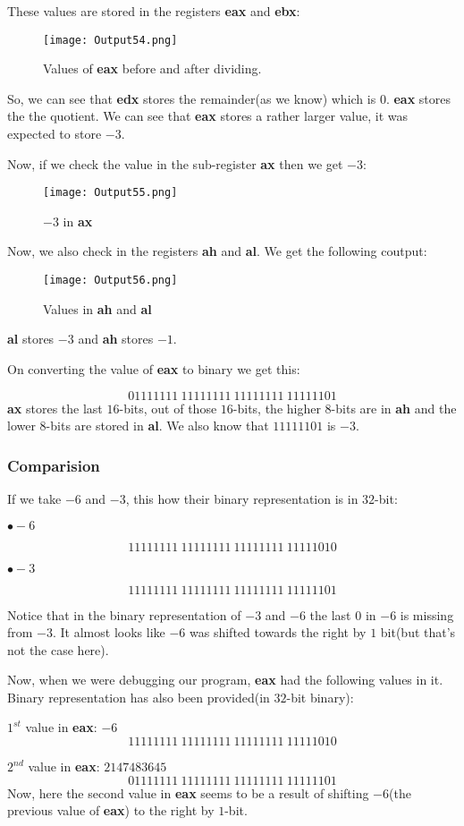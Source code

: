 \documentclass{article}
\makeatletter
\renewcommand\paragraph{\@startsection{paragraph}{4}{\z@}{-3.25ex \@plus -1ex \@minus -.2ex}{1.5ex \@plus .2ex}{\normalfont\normalsize\bfseries}}
\makeatother
\begin{document}
These values are stored in the registers \textbf{eax} and \textbf{ebx}:
\begin{figure}[h]
\centering
\texttt{[image: Output54.png]}
\caption{Values of \textbf{eax} before and after dividing.}
\label{fig:fig2}
\end{figure}

So, we can see that \textbf{edx} stores the remainder(as we know) which is $0$. \textbf{eax} stores the the quotient. We can see that \textbf{eax} stores a rather larger value, it was expected to store $-3$.

Now, if we check the value in the sub-register \textbf{ax} then we get $-3$:
\begin{figure}[h]
\centering
\texttt{[image: Output55.png]}
\caption{$-3$ in \textbf{ax}}
\label{fig:fig3}
\end{figure}

\newpage
Now, we also check in the registers \textbf{ah} and \textbf{al}. We get the following coutput:
\begin{figure}[h]
\centering
\texttt{[image: Output56.png]}
\caption{Values in \textbf{ah} and \textbf{al}}
\label{fig:fig4}
\end{figure}

\textbf{al} stores $-3$ and \textbf{ah} stores $-1$.

On converting the value of \textbf{eax} to binary we get this:

$$
01111111\ 11111111\ 11111111\ 11111101
$$
\textbf{ax} stores the last $16$-bits, out of those $16$-bits, the higher $8$-bits are in \textbf{ah} and the lower $8$-bits are stored in \textbf{al}. We also know that $11111101$ is $-3$.

\subsubsection{Comparision}\label{sec:subsubsec1}
\paragraph{}
If we take $-6$ and $-3$, this how their binary representation is in $32$-bit:

$\bullet -6$

$$
11111111\ 11111111\ 11111111\ 11111010
$$

$\bullet -3$

$$
11111111\ 11111111\ 11111111\ 11111101
$$

Notice that in the binary representation of $-3$ and $-6$ the last $0$ in $-6$ is missing from $-3$. It almost looks like $-6$ was shifted towards the right by $1$ bit(but that's not the case here).

Now, when we were debugging our program, \textbf{eax} had the following values in it. Binary representation has also been provided(in $32$-bit binary):

$1^{st}$ value in \textbf{eax}: $-6$
$$
11111111\ 11111111\ 11111111\ 11111010
$$

$2^{nd}$ value in \textbf{eax}: $2147483645$
$$
01111111\ 11111111\ 11111111\ 11111101
$$
Now, here the second value in \textbf{eax} seems to be a result of shifting $-6$(the previous value of \textbf{eax}) to the right by $1$-bit.
\end{document}
